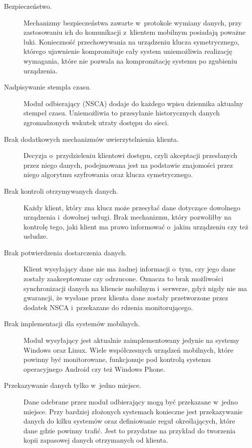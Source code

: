 \begin{description}
\item[Bezpieczeństwo.] Mechanizmy bezpieczeństwa zawarte w~protokole
  wymiany danych, przy zastosowaniu ich do komunikacji z~klientem
  mobilnym posiadają poważne luki. Konieczność przechowywania na
  urządzeniu klucza symetrycznego, którego ujawnienie kompromituje
  cały system uniemożliwia realizację wymagania, które nie pozwala na
  kompromitację systemu po zgubieniu urządzenia.
\item[Nadpisywanie stempla czasu.] Moduł odbierający (NSCA) dodaje do
  każdego wpisu dziennika aktualny stempel czasu. Uniemożliwia to
  przesyłanie historycznych danych zgromadzonych wskutek utraty
  dostępu do sieci.
\item[Brak dodatkowych mechanizmów uwierzytelnienia klienta.] Decyzja
  o~przydzieleniu klientowi dostępu, czyli akceptacji przesłanych
  przez niego danych, podejmowana jest na podstawie znajomości przez
  niego algorytmu szyfrowania oraz klucza symetrycznego.
\item[Brak kontroli otrzymywanych danych.] Każdy klient, który zna
  klucz może przesyłać dane dotyczące dowolnego urządzenia i~dowolnej
  usługi. Brak mechanizmu, który pozwoliłby na kontrolę tego, jaki
  klient ma prawo informować o~jakim urządzeniu czy też usłudze.
\item[Brak potwierdzenia dostarczenia danych.] Klient wysyłający dane
  nie ma żadnej informacji o~tym, czy jego dane zostały zaakceptowane
  czy odrzucone. Oznacza to brak możliwości synchronizacji danych na
  kliencie mobilnym i~serwerze, gdyż nigdy nie ma gwarancji, że
  wysłane przez klienta dane zostały przetworzone przez dodatek NSCA
  i~przekazane do rdzenia monitorującego.
\item[Brak implementacji dla systemów mobilnych.] Moduł wysyłający
  jest aktualnie zaimplementowany jedynie na systemy Windows oraz
  Linux. Wiele współczesnych urządzeń mobilnych, które powinny być
  monitorowane, funkcjonuje pod kontrolą systemu operacyjnego Android
  czy też Windows Phone.
\item[Przekazywanie danych tylko w~jedno miejsce.] Dane odebrane przez
  moduł odbierający mogą być przekazane w~jedno miejsce. Przy bardziej
  złożonych systemach konieczne jest przekazywanie danych do kilku
  systemów oraz definiowanie reguł określających, które dane gdzie
  powinny trafić. Jest to przydatne na przykład do tworzenia kopii
  zapasowej danych otrzymanych od klienta.
\end{description}


